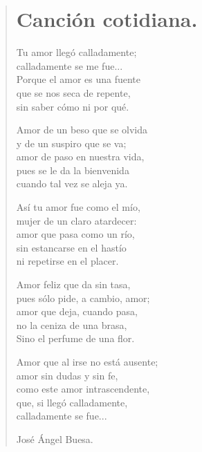 \documentclass[11pt, portrait, twoside, notitlepage, openright]{book}
\begin{document}
\newpage
\begin{verse}
\begin{center}
\section{Canción cotidiana.}
\end{center}
Tu amor llegó calladamente;\\
calladamente se me fue...\\
Porque el amor es una fuente\\
que se nos seca de repente,\\
sin saber cómo ni por qué.
\newline

Amor de un beso que se olvida\\
y de un suspiro que se va;\\
amor de paso en nuestra vida,\\
pues se le da la bienvenida\\
cuando tal vez se aleja ya.
\newline

Así tu amor fue como el mío,\\
mujer de un claro atardecer:\\
amor que pasa como un río,\\
sin estancarse en el hastío\\
ni repetirse en el placer.
\newline

Amor feliz que da sin tasa,\\
pues sólo pide, a cambio, amor;\\
amor que deja, cuando pasa,\\
no la ceniza de una brasa,\\
Sino el perfume de una flor.
\newpage

Amor que al irse no está ausente;\\
amor sin dudas y sin fe,\\
como este amor intrascendente,\\
que, si llegó calladamente,\\
calladamente se fue...
\newline

José Ángel Buesa.
\end{verse}
\end{document}
